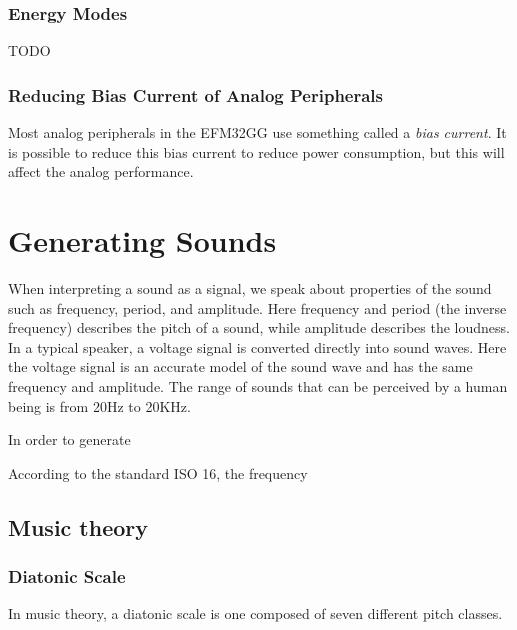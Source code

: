 \subsubsection{Energy Modes}
TODO %

\subsubsection{Reducing Bias Current of Analog Peripherals}
Most analog peripherals in the EFM32GG use something called a \emph{bias current}. It is possible to reduce this bias current to reduce power consumption, but this will affect the analog performance.\cite{efm32-energy-optimization}

%



\section{Generating Sounds}
When interpreting a sound as a signal, we speak about properties of the sound such as frequency, period, and amplitude. Here frequency and period (the inverse frequency) describes the pitch of a sound, while amplitude describes the loudness. In a typical speaker, a voltage signal is converted directly into sound waves. Here the voltage signal is an accurate model of the sound wave and has the same frequency and amplitude. The range of sounds that can be perceived by a human being is from 20Hz to 20KHz.\cite{compendium}

In order to generate 

According to the standard ISO 16, the frequency 


\subsection{Music theory}

\subsubsection{Diatonic Scale}
In music theory, a diatonic scale is one composed of seven different pitch classes.
